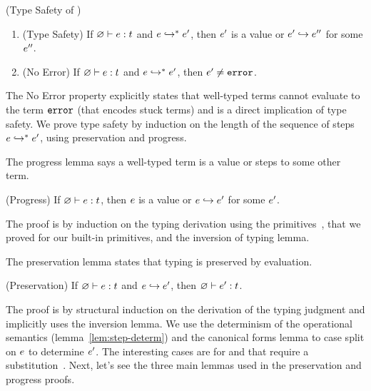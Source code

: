 \begin{theorem} (Type Safety of \sysrf) 
\label{lem:soundness} 
\begin{enumerate}
    \item (Type Safety)
    If ${\varnothing} \vdash {\ensuremath{e}} : {t}$ and ${e} \hookrightarrow^{*} {e'}$,
    then $e'$ is a value or $e' \hookrightarrow e''$
    for some $e''$.
    \item (No Error)
    If ${\varnothing} \vdash {\ensuremath{e}} : {t}$ and ${e} \hookrightarrow^{*} {e'}$,
    then $e' \not = \texttt{error}$.
\end{enumerate}
\end{theorem}
The No Error property explicitly states that well-typed terms 
cannot evaluate to the term $\texttt{error}$ (that encodes stuck terms)
and is a direct implication of type safety.
We prove type safety by induction on the 
length of the sequence of steps  
${e} \hookrightarrow^{*} {e'}$, using  
preservation and progress.

 \label{sec:sysf:progress}
%
The progress lemma says a well-typed term is a value 
or steps to some other term.
%
\begin{lemma} (Progress) \label{lem:progressF} 
If ${\varnothing} \vdash {\ensuremath{e}} : {t}$, 
then $e$ is a value or $e \hookrightarrow e'$ for some $e'$.
\end{lemma}

The proof is by induction on the typing derivation 
using the primitives~, that we proved 
for our built-in primitives, and the inversion of typing lemma.



 \label{sec:sysf:preservation}
%
The preservation lemma states that typing is preserved
by evaluation.
%
\begin{lemma} (Preservation) \label{lem:preservationF} 
If ${\varnothing} \vdash {\ensuremath{e}} : {t}$ and $e \hookrightarrow e'$, 
then $\hastype{\varnothing}{\sexpr'}{\stype}$.
\end{lemma}    

The proof is by structural induction on the 
derivation of the typing judgment and implicitly uses the 
inversion lemma. 
We use the determinism of the operational 
semantics (lemma~\ref{lem:step-determ}) and 
the canonical forms lemma to case split 
on $e$ to determine $e'$.
%
The interesting cases are for \fApp and \fTApp that require 
a substitution~.
%
Next, let's see the three main lemmas used in 
the preservation and progress proofs.

